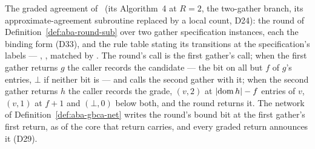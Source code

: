 \begin{definition}
  \label{def:aba-gbca-pair}
  \leanok
  The graded agreement of~\cite{AFW25} (its Algorithm~4 at $R = 2$, the two-gather branch, its approximate-agreement subroutine replaced by a local count, D24): the round of Definition~\ref{def:aba-round-sub} over two gather specification instances, each the binding form (D33), and the rule table stating its transitions at the specification's labels --- , , matched by .
  The round's call is the first gather's call; when the first gather returns $g$ the caller records the candidate --- the bit on all but $f$ of $g$'s entries, $\bot$ if neither bit is --- and calls the second gather with it; when the second gather returns $h$ the caller records the grade, $(v, 2)$ at $|{\rm dom}\, h| - f$ entries of $v$, $(v, 1)$ at $f{+}1$ and $(\bot, 0)$ below both, and the round returns it.
  The network of Definition~\ref{def:aba-gbca-net} writes the round's bound bit at the first gather's first return, as  of the core that return carries, and every graded return announces it (D29).
\end{definition}

